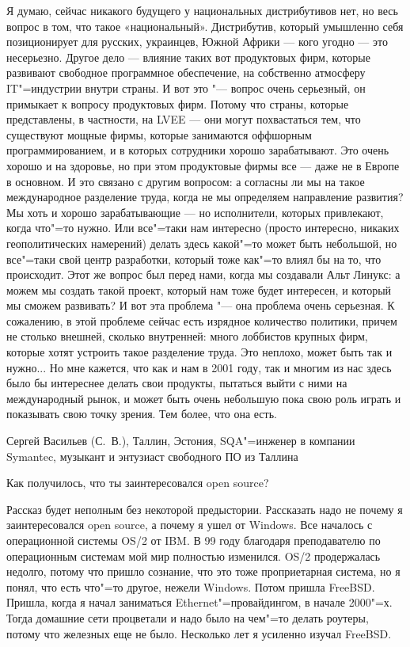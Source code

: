 \documentclass[10pt, a5paper]{article}
\begin{document}
Я думаю, сейчас никакого будущего у национальных дистрибутивов нет, но весь вопрос в том, что такое «национальный». Дистрибутив, который умышленно себя позиционирует для русских, украинцев, Южной Африки — кого угодно — это несерьезно. Другое дело — влияние таких вот продуктовых фирм, которые развивают свободное программное обеспечение, на собственно атмосферу IT"=индустрии внутри страны. И вот это "--- вопрос очень серьезный, он примыкает к вопросу продуктовых фирм. Потому что страны, которые представлены, в частности, на LVEE — они могут похвастаться тем, что существуют мощные фирмы, которые занимаются оффшорным программированием, и в которых сотрудники хорошо зарабатывают. Это очень хорошо и на здоровье, но при этом  продуктовые фирмы все — даже не в Европе в основном. И это связано с другим вопросом: а согласны ли мы на такое международное разделение труда, когда не мы определяем направление развития? Мы хоть и хорошо зарабатывающие — но исполнители, которых привлекают, когда что"=то нужно. Или все"=таки нам интересно (просто интересно, никаких геополитических намерений) делать здесь какой"=то может быть небольшой, но все"=таки свой центр разработки, который тоже как"=то влиял бы на то, что происходит. Этот же вопрос был перед нами, когда мы создавали Альт Линукс: а можем мы создать такой проект, который нам тоже будет интересен, и который мы сможем развивать? И вот эта проблема "--- она проблема очень серьезная. К сожалению, в этой проблеме сейчас есть изрядное количество политики, причем не столько внешней, сколько внутренней: много лоббистов крупных фирм, которые хотят устроить такое разделение труда. Это неплохо, может быть так и нужно... Но мне кажется, что как и нам в 2001 году, так и многим из нас здесь было бы интереснее делать свои продукты, пытаться выйти с ними на международный рынок, и может быть очень небольшую пока свою роль играть и показывать свою точку зрения. Тем более, что она есть. 

\interview Сергей Васильев (С.~В.), Таллин, Эстония, SQA"=инженер в компании Symantec, музыкант и энтузиаст свободного ПО из Таллина

\q Как получилось, что ты заинтересовался open source?

\a Рассказ будет неполным без некоторой предыстории. Рассказать надо не почему я заинтересовался open source, а почему я ушел от Windows. Все началось с операционной системы OS/2 от IBM. В 99 году благодаря преподавателю по операционным системам мой мир полностью изменился. OS/2 продержалась недолго, потому что пришло сознание, что это тоже проприетарная система, но я понял, что есть что"=то другое, нежели Windows. Потом пришла FreeBSD. Пришла, когда я начал заниматься Ethernet"=провайдингом, в начале 2000"=х. Тогда домашние сети процветали и надо было на чем"=то делать роутеры, потому что железных еще не было. Несколько лет я усиленно изучал FreeBSD.
\end{document}
